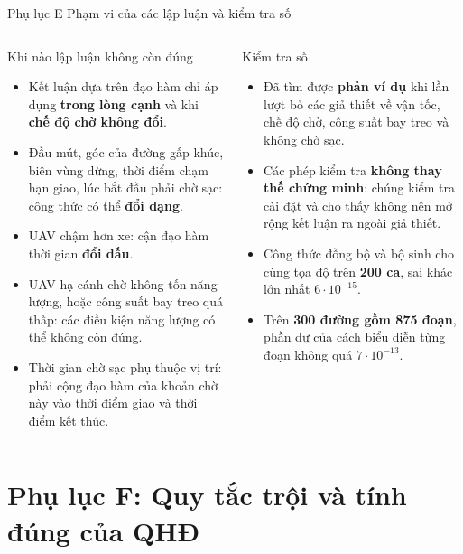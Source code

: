 \documentclass[aspectratio=169,10pt,t,xcolor={table}]{beamer}
\newcommand{\apptitle}[2]{Phụ lục #1 \textperiodcentered{} #2}
\begin{document}
\begin{frame}{\apptitle{E}{Phạm vi của các lập luận và kiểm tra số}}
\begin{columns}[T,onlytextwidth]
\begin{alertblock}{Khi nào lập luận không còn đúng}
\scriptsize
\begin{itemize}
\item Kết luận dựa trên đạo hàm chỉ áp dụng \textbf{trong lòng cạnh} và khi \textbf{chế độ chờ không đổi}.
\item Đầu mút, góc của đường gấp khúc, biên vùng dừng, thời điểm chạm hạn giao, lúc bắt đầu phải chờ sạc: công thức có thể \textbf{đổi dạng}.
\item UAV chậm hơn xe: cận đạo hàm thời gian \textbf{đổi dấu}.
\item UAV hạ cánh chờ không tốn năng lượng, hoặc công suất bay treo quá thấp: các điều kiện năng lượng có thể không còn đúng.
\item Thời gian chờ sạc phụ thuộc vị trí: phải cộng đạo hàm của khoản chờ này vào thời điểm giao và thời điểm kết thúc.
\end{itemize}
\end{alertblock}
\begin{block}{Kiểm tra số}
\scriptsize
\begin{itemize}
\item Đã tìm được \textbf{phản ví dụ} khi lần lượt bỏ các giả thiết về vận tốc, chế độ chờ, công suất bay treo và không chờ sạc.
\item Các phép kiểm tra \textbf{không thay thế chứng minh}: chúng kiểm tra cài đặt và cho thấy không nên mở rộng kết luận ra ngoài giả thiết.
\item Công thức đồng bộ và bộ sinh cho cùng tọa độ trên \textbf{200 ca}, sai khác lớn nhất $6\cdot10^{-15}$.
\item Trên \textbf{300 đường gồm 875 đoạn}, phần dư của cách biểu diễn từng đoạn không quá $7\cdot10^{-13}$.
\end{itemize}
\end{block}
\end{columns}
\end{frame}

\section{Phụ lục F: Quy tắc trội và tính đúng của QHĐ}
\end{document}
